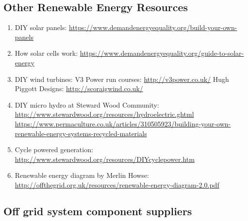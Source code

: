 \documentclass{article}
\theoremstyle{definition}
\theoremstyle{definition}
\theoremstyle{remark}
\begin{document}

  \subsection{Other Renewable Energy Resources} %
  \label{sub:other_renewable_energy_resources}
  
    \begin{enumerate}[resume]
      \item DIY solar panels: \href{https://www.demandenergyequality.org/build-your-own-panels}{https://www.demandenergyequality.org/build-your-own-panels}
      \item How solar cells work: \href{https://www.demandenergyequality.org/guide-to-solar-energy}{https://www.demandenergyequality.org/guide-to-solar-energy}
      \item DIY wind turbines: \newline
      V3 Power run courses: \href{http://v3power.co.uk/}{http://v3power.co.uk/} \newline
      Hugh Piggott Designs: \href{http://scoraigwind.co.uk/}{http://scoraigwind.co.uk/}
      \item DIY micro hydro at Steward Wood Community: \newline
      \href{http://www.stewardwood.org/resources/hydroelectric.ghtml}{http://www.stewardwood.org/resources/hydroelectric.ghtml} \newline
      \href{https://www.permaculture.co.uk/articles/310505923/building-your-own-renewable-energy-systems-recycled-materials}{https://www.permaculture.co.uk/articles/310505923/building-your-own-renewable-energy-systems-recycled-materials}
      \item Cycle powered generation: \href{http://www.stewardwood.org/resources/DIYcyclepower.htm}{http://www.stewardwood.org/resources/DIYcyclepower.htm}
      \item Renewable energy diagram by Merlin Howse: \newline
      \href{http://offthegrid.org.uk/resources/renewable-energy-diagram-2.0.pdf}{http://offthegrid.org.uk/resources/renewable-energy-diagram-2.0.pdf}
    \end{enumerate}



  \subsection{Off grid system component suppliers} %
  \label{sub:off_grid_system_component_suppliers}
\end{document}
